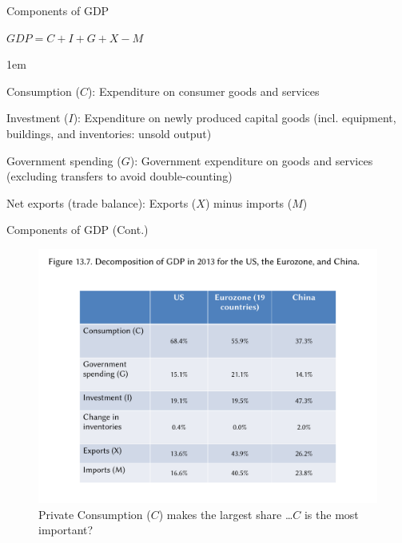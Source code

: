 \documentclass[11pt,aspectratio=43,usenames,dvipsnames]{beamer}
\let\olditemize=\itemize
\let\endolditemize=\enditemize
\renewenvironment{itemize}{\olditemize \itemsep1em}{\endolditemize}
\theoremstyle{definition}
\begin{document}
\begin{frame}{Components of GDP}
\label{slide:Components_of_GDP}
    \begin{center}
        $ GDP = C + I + G + X - M $
    \end{center}
    \begin{itemize}
        \item Consumption ($ C $): Expenditure on consumer goods and services
        \item Investment ($ I $): Expenditure on newly produced capital goods (incl. equipment, buildings, and inventories: unsold output)
        \item Government spending ($ G $): Government expenditure on goods and services (excluding transfers to avoid double-counting)
        \item Net exports (trade balance): Exports ($ X $) minus imports ($ M $)
    \end{itemize}

\end{frame}

\begin{frame}{Components of GDP (Cont.)}
\label{slide:Components_of_GDP__Cont__}
    \begin{figure}
        \centering
        \includegraphics[width=.8\textwidth]{./figures/5.pdf}
        \caption{Private Consumption ($C$) makes the largest share \ldots $ C $ is the most important?}
    \end{figure}
\end{frame}
\end{document}
